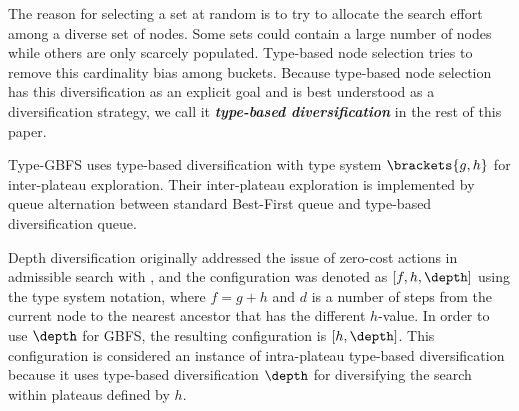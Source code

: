 The reason for selecting a set at random is to try to allocate the search effort among a diverse set of nodes.
Some sets could contain a large number of nodes while others are only scarcely populated.
Type-based node selection tries to remove this cardinality bias among buckets.
Because type-based node selection  has this diversification as an explicit goal and is best understood as a diversification strategy, we call it \textbf{\emph{type-based diversification}} in the rest of this paper.

Type-GBFS \cite{xie14type} uses type-based diversification with type system $\brackets{g,h}$ for inter-plateau
exploration. Their inter-plateau exploration is implemented by queue alternation \cite{RogerH10} between
standard Best-First queue and type-based diversification queue.

Depth diversification \cite{Asai2016} originally addressed the issue of zero-cost actions in admissible search with \astar,
and the configuration was denoted as $[f,h,\depth]$ using the type system notation, where $f=g+h$ and $d$ is a number of steps from the current node to the nearest ancestor that has the different $h$-value.
In order to use $\depth$ for GBFS, the resulting configuration is $[h,\depth]$.
This configuration is considered an instance of intra-plateau type-based diversification because
it uses type-based diversification $\depth$ for diversifying the search within plateaus defined by $h$.

